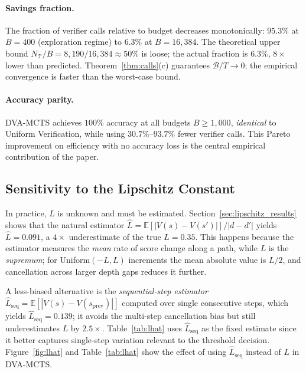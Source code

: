 \paragraph{Savings fraction.}
The fraction of verifier calls relative to budget decreases monotonically:
$95.3\%$ at $B{=}400$ (exploration regime) to $\mathbf{6.3\%}$ at $B{=}16{,}384$.
The theoretical upper bound $N_{\mathcal{T}}/B = 8{,}190/16{,}384 \approx 50\%$ is
loose; the actual fraction is $6.3\%$, $8\times$ lower than predicted.
Theorem~\ref{thm:calls}(c) guarantees $\mathcal{B}/T \to 0$; the empirical
convergence is faster than the worst-case bound.

\paragraph{Accuracy parity.}
DVA-MCTS achieves $100\%$ accuracy at all budgets $B \geq 1{,}000$, \emph{identical}
to Uniform Verification, while using $30.7\%$--$93.7\%$ fewer verifier calls.
This Pareto improvement on efficiency with no accuracy loss is the central
empirical contribution of the paper.

\subsection{Sensitivity to the Lipschitz Constant}
\label{sec:lhat}

In practice, $L$ is unknown and must be estimated. Section~\ref{sec:lipschitz_results}
shows that the natural estimator $\hat{L} = \mathbb{E}[|V(s) - V(s')|] / |d{-}d'|$
yields $\hat{L}{=}0.091$, a $4\times$ underestimate of the true $L{=}0.35$.
This happens because the estimator measures the \emph{mean} rate of score change
along a path, while $L$ is the \emph{supremum}; for Uniform$(-L, L)$ increments
the mean absolute value is $L/2$, and cancellation across larger depth gaps
reduces it further.

A less-biased alternative is the \emph{sequential-step estimator}
$\hat{L}_{\text{seq}} = \mathbb{E}[|V(s){-}V(s_{\text{prev}})|]$ computed over single
consecutive steps, which yields $\hat{L}_{\text{seq}}{=}0.139$; it avoids the
multi-step cancellation bias but still underestimates $L$ by $2.5\times$.
Table~\ref{tab:lhat} uses $\hat{L}_{\text{seq}}$ as the fixed estimate since it better
captures single-step variation relevant to the threshold decision.
Figure~\ref{fig:lhat} and Table~\ref{tab:lhat} show the effect of using $\hat{L}_{\text{seq}}$
instead of $L$ in DVA-MCTS.

